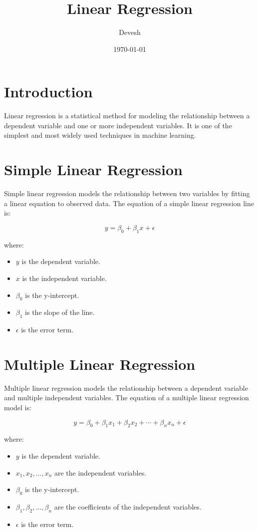 \documentclass{article}
\title{Linear Regression}
\author{Devesh}
\date{\today}
\begin{document}
\maketitle

\section{Introduction}
Linear regression is a statistical method for modeling the relationship between a dependent variable and one or more independent variables. It is one of the simplest and most widely used techniques in machine learning.

\section{Simple Linear Regression}
Simple linear regression models the relationship between two variables by fitting a linear equation to observed data. The equation of a simple linear regression line is:

\begin{equation}
y = \beta_0 + \beta_1 x + \epsilon
\end{equation}

where:
\begin{itemize}
    \item \( y \) is the dependent variable.
    \item \( x \) is the independent variable.
    \item \( \beta_0 \) is the y-intercept.
    \item \( \beta_1 \) is the slope of the line.
    \item \( \epsilon \) is the error term.
\end{itemize}

\section{Multiple Linear Regression}
Multiple linear regression models the relationship between a dependent variable and multiple independent variables. The equation of a multiple linear regression model is:

\begin{equation}
y = \beta_0 + \beta_1 x_1 + \beta_2 x_2 + \cdots + \beta_n x_n + \epsilon
\end{equation}

where:
\begin{itemize}
    \item \( y \) is the dependent variable.
    \item \( x_1, x_2, \ldots, x_n \) are the independent variables.
    \item \( \beta_0 \) is the y-intercept.
    \item \( \beta_1, \beta_2, \ldots, \beta_n \) are the coefficients of the independent variables.
    \item \( \epsilon \) is the error term.
\end{itemize}
\end{document}
